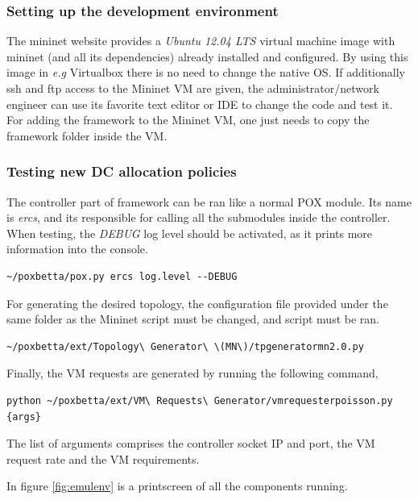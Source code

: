 \documentclass[12pt,english,oneside]{book}
\begin{document}
\subsubsection{Setting up the development environment}
\hspace{0.6cm}

The mininet website provides a \textit{Ubuntu 12.04 LTS} virtual machine image with mininet (and all its dependencies) already installed and configured. By using this image in \textit{e.g} Virtualbox\cite{vbox} there is no need to change the native OS. If additionally ssh and ftp access to the Mininet VM are given, the administrator/network engineer can use its favorite text editor or IDE to change the code and test it.
For adding the framework to the Mininet VM, one just needs to copy the framework folder inside the VM.

\subsubsection{Testing new DC allocation policies}

The controller part of framework can be ran like a normal POX module. Its name is \textit{ercs}, and its responsible for calling all the submodules inside the controller. When testing, the \textit{DEBUG} log level should be activated, as it prints more information into the console.
\begin{verbatim}
~/poxbetta/pox.py ercs log.level --DEBUG
\end{verbatim}

For generating the desired topology, the configuration file provided under the same folder as the Mininet script must be changed, and script must be ran.
\begin{verbatim}
~/poxbetta/ext/Topology\ Generator\ \(MN\)/tpgeneratormn2.0.py 
\end{verbatim}

Finally, the VM requests are generated by running the following command,
\begin{verbatim}
python ~/poxbetta/ext/VM\ Requests\ Generator/vmrequesterpoisson.py {args}
\end{verbatim}

The list of arguments comprises the controller socket IP and port, the VM request rate and the VM requirements.

\newpage

In figure \ref{fig:emulenv} is a printscreen of all the components running.
\end{document}
